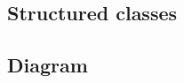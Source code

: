 \documentclass[12pt]{article} %
\begin{document}
\subsection{Structured classes}

\subsection{Diagram}

\newpage%
% 
% 
%
\end{document}
